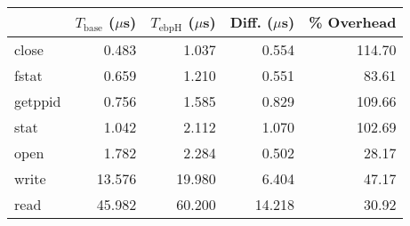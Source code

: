 \begin{tabular}{>{\ttfamily}lrrrr}
\toprule
\multicolumn{1}{l}{System Call} & $T_\text{base}$ ($\mu$s) & $T_\text{ebpH}$ ($\mu$s) & Diff. ($\mu$s) & \% Overhead \\
\midrule
                          close &                    0.483 &                    1.037 &          0.554 &      114.70 \\
                          fstat &                    0.659 &                    1.210 &          0.551 &       83.61 \\
                        getppid &                    0.756 &                    1.585 &          0.829 &      109.66 \\
                           stat &                    1.042 &                    2.112 &          1.070 &      102.69 \\
                           open &                    1.782 &                    2.284 &          0.502 &       28.17 \\
                          write &                   13.576 &                   19.980 &          6.404 &       47.17 \\
                           read &                   45.982 &                   60.200 &         14.218 &       30.92 \\
\bottomrule
\end{tabular}
